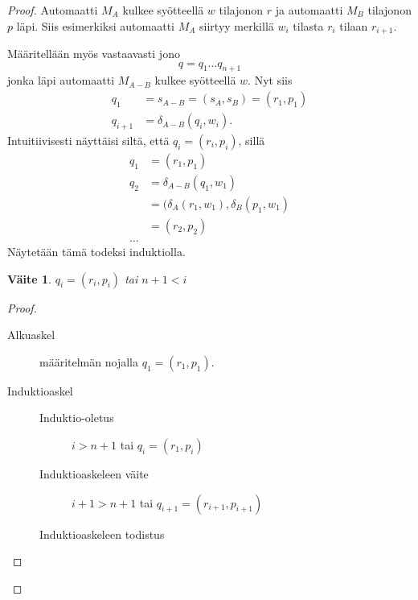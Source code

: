 \documentclass[a4paper,11pt,draft]{article}
\newtheorem*{claim}{Väite}
\begin{document}
\begin{enumerate}
\begin{proof}
%
    Automaatti $M_A$ kulkee syötteellä $w$ tilajonon $r$ ja automaatti
    $M_B$ tilajonon $p$ läpi. Siis esimerkiksi automaatti $M_A$
    siirtyy merkillä $w_i$ tilasta $r_i$ tilaan $r_{i+1}$.

    Määritellään myös vastaavasti jono
% 
   \begin{equation*}
      q = q_{1} \ldots q_{n+1}
    \end{equation*}
% 
   jonka läpi automaatti $M_{A-B}$ kulkee syötteellä $w$. Nyt siis
%
    \begin{align*}
      q_1 &= s_{A-B} = (s_A, s_B) = (r_1,p_1) \\
      q_{i+1} &= \delta_{A-B}(q_i, w_i).
    \end{align*}
%
    Intuitiivisesti näyttäisi siltä, että $q_i = (r_i,p_i)$, sillä
%
    \begin{align*}
      q_1 &= (r_1, p_1) \\
      q_2 &= \delta_{A-B}(q_1, w_1) \\
          &= (\delta_A(r_1, w_1), \delta_B(p_1, w_1) \\
          &= (r_2, p_2) \\
      \ldots &
    \end{align*}
%
    Näytetään tämä todeksi induktiolla.
%
    \begin{claim}
      $q_i = (r_i,p_i)$ tai $n+1 < i$
    \end{claim}
%
    \begin{proof}
      \begin{description} \item[]
        \item[Alkuaskel] määritelmän nojalla $q_1 = (r_1,p_1)$.
        \item[Induktioaskel]
          \begin{description}\item[]
            \item[Induktio-oletus] $i > n+1$ tai $q_i = (r_1,p_i)$
            \item[Induktioaskeleen väite] $i+1 > n+1$ tai $q_{i+1} =
            (r_{i+1}, p_{i+1})$

            \item[Induktioaskeleen todistus] \mbox{} %


\end{description}
\end{description}
\end{proof}
\end{proof}
\end{enumerate}
\end{document}

